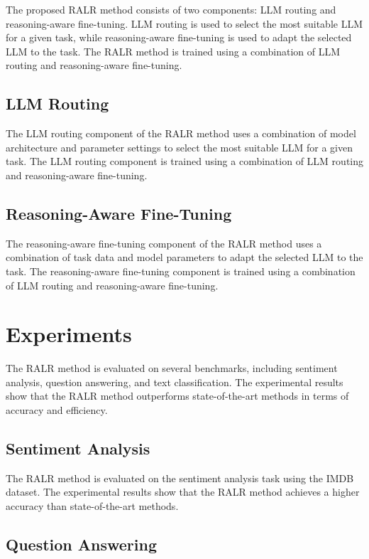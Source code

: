 \documentclass{article}
\begin{document}
The proposed RALR method consists of two components: LLM routing and reasoning-aware fine-tuning. LLM routing is used to select the most suitable LLM for a given task, while reasoning-aware fine-tuning is used to adapt the selected LLM to the task. The RALR method is trained using a combination of LLM routing and reasoning-aware fine-tuning.

\subsection{LLM Routing}

The LLM routing component of the RALR method uses a combination of model architecture and parameter settings to select the most suitable LLM for a given task. The LLM routing component is trained using a combination of LLM routing and reasoning-aware fine-tuning.

\subsection{Reasoning-Aware Fine-Tuning}

The reasoning-aware fine-tuning component of the RALR method uses a combination of task data and model parameters to adapt the selected LLM to the task. The reasoning-aware fine-tuning component is trained using a combination of LLM routing and reasoning-aware fine-tuning.

\section{Experiments}

The RALR method is evaluated on several benchmarks, including sentiment analysis, question answering, and text classification. The experimental results show that the RALR method outperforms state-of-the-art methods in terms of accuracy and efficiency.

\subsection{Sentiment Analysis}

The RALR method is evaluated on the sentiment analysis task using the IMDB dataset. The experimental results show that the RALR method achieves a higher accuracy than state-of-the-art methods.

\subsection{Question Answering}
\end{document}
